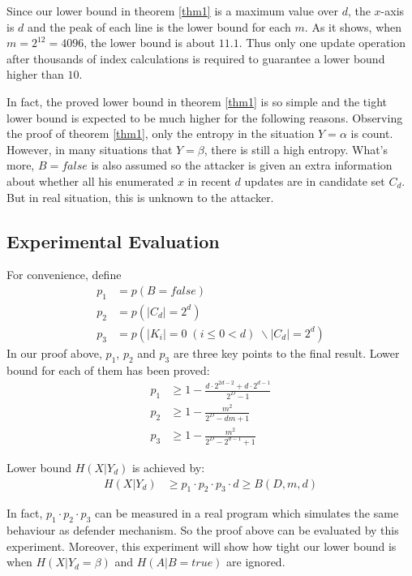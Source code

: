 \documentclass[10pt, conference, compsocconf]{IEEEtran}
\begin{document}
		Since our lower bound in theorem \ref{thm1} is a maximum value
		over $d$, the $x$-axis is $d$ and the peak of each line
		is the lower bound for each $m$. As it shows, when $m = 2^{12} = 4096$, the lower
		bound is about $11.1$. 
		Thus only one update operation after thousands of index calculations is required
		to guarantee a lower bound higher than $10$.
		
		In fact, the proved lower bound in theorem \ref{thm1} is so
		simple and the tight lower bound is expected to be much higher
		for the following reasons.
		Observing the proof of theorem \ref{thm1}, only the
		entropy in the situation $Y = \alpha$ is count. However, in
		many situations that $Y = \beta$, there is still a high entropy.
		What's more, $B = false$ is also assumed so the attacker is
		given an extra information about whether all his enumerated $x$
		in recent $d$ updates are in candidate set $C_d$. But
		in real situation, this is unknown to the attacker.
		
	\subsection{Experimental Evaluation}
		For convenience, define
		\begin{align*}
		 p_1 &= p(B = false)\\
		 p_2 &= p(|C_d| = 2^d)\\
		 p_3 &= p(|K_i| = 0 \; (i \leq 0 < d) \; \backslash |C_d| = 2^d)
		\end{align*}
		In our proof above, $p_1$,
		$p_2$ and $p_3$ are 
		three key points to the final result.
		Lower bound for each of them has been proved:
		\begin{align*}
			p_1 &\geq 1-\frac{d \cdot 2^{2d-2}+d \cdot 2^{d-1}}{2^D-1}\\
			p_2 &\geq 1-\frac{m^2}{2^D-dm+1}\\
			p_3 &\geq 1-\frac{m^2}{2^D-2^{d-1}+1}
		\end{align*}
		
		Lower bound $H(X | Y_d)$ is achieved by:
		\begin{align*}
			H(X | Y_d) &\geq p_1 \cdot p_2 \cdot p_3 \cdot d
				\geq B(D, m, d)
		\end{align*}
		
		In fact, $p_1 \cdot p_2 \cdot p_3$ can be measured in a real program which 
		simulates the same behaviour as defender mechanism.
		So the proof above can be evaluated by this experiment.
		Moreover, this experiment will show how tight our lower bound is
		when $H(X | Y_d = \beta)$ and $H(A | B = true)$ are ignored.
		
\end{document}
